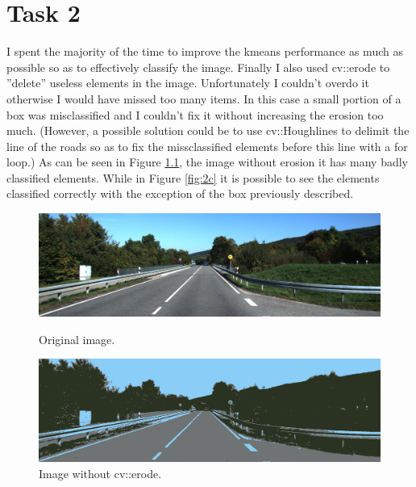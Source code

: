 \chapter{Task 2}
I spent the majority of the time to improve the kmeans performance as much as possible so as to effectively classify the image. Finally I also used cv::erode to ”delete” useless elements in the image. Unfortunately I couldn’t overdo it otherwise I would have missed too many items. In this case a small portion of a box was misclassified and I couldn’t fix it without increasing the erosion too much. (However, a possible solution could be to use cv::Houghlines to delimit the line of the roads so as to fix the missclassified elements before this line with a for loop.) As can be seen in Figure \ref{fig:2b}, the image without erosion it has many badly classified elements. While in Figure \ref{fig:2c} it is possible to see the elements classified correctly with the exception of the box previously described.

\begin{figure}[h]
	\centering
	\begin{minipage}{0.45\textwidth}
		\centering
		\includegraphics[width=\linewidth]{images/source/original/4}
		\caption{Original image.}
		\label{fig:2a}
        \end{minipage}
        \hspace{0.05\textwidth}
        \begin{minipage}{0.45\textwidth}
        		\centering
		\includegraphics[width=\linewidth]{images/source/task2/1}
		\caption{Image without cv::erode.}
		\label{fig:2b}
        \end{minipage}
\end{figure}

